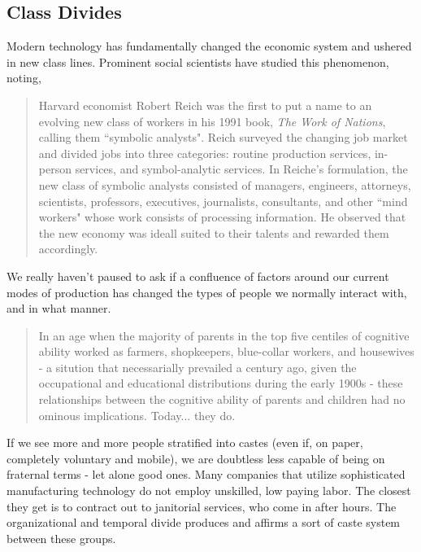 \documentclass[letterpaper]{article}
\begin{document}
\subsection{Class Divides}


Modern technology has fundamentally changed the economic system and ushered in new class lines. Prominent social scientists have studied this phenomenon, noting,

\begin{quote}
  Harvard economist Robert Reich was the first to put a name to an evolving new class of workers in his 1991 book, \textit{The Work of Nations}, calling them ``symbolic analysts". Reich surveyed the changing job market and divided jobs into three categories: routine production services, in-person services, and symbol-analytic services. In Reiche's formulation, the new class of symbolic analysts consisted of managers, engineers, attorneys, scientists, professors, executives, journalists, consultants, and other ``mind workers" whose work consists of processing information. He observed that the new economy was ideall suited to their talents and rewarded them accordingly.
\end{quote}

We really haven't paused to ask if a confluence of factors around our current modes of production has changed the types of people we normally interact with, and in what manner.

\begin{quote}
  In an age when the majority of parents in the top five centiles of cognitive ability worked as farmers, shopkeepers, blue-collar workers, and housewives - a sitution that necessarially prevailed a century ago, given the occupational and educational distributions during the early 1900s - these relationships between the cognitive ability of parents and children had no ominous implications. Today... they do.
\end{quote}

If we see more and more people stratified into castes (even if, on paper, completely voluntary and mobile), we are doubtless less capable of being on fraternal terms - let alone good ones. Many companies that utilize sophisticated manufacturing technology do not employ unskilled, low paying labor. The closest they get is to contract out to janitorial services, who come in after hours. The organizational and temporal divide produces and affirms a sort of caste system between these groups.
\end{document}
